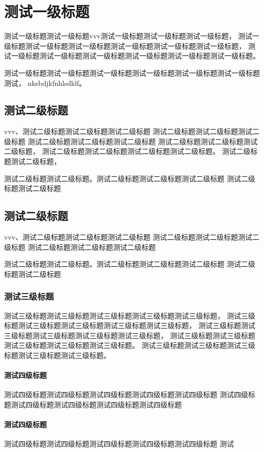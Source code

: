 \chapter{测试一级标题}
    测试一级标题测试一级标题vvv测试一级标题测试一级标题测试一级标题，
    测试一级标题测试一级标题测试一级标题测试一级标题测试一级标题测试一级标题，
    测试一级标题测试一级标题测试一级标题测试一级标题测试一级标题测试一级标题。

    测试一级标题测试一级标题测试一级标题测试一级标题测试一级标题测试一级标题测试，
    nksbdjkfnhlsdklf。
    \section{测试二级标题}
        vvv、测试二级标题测试二级标题测试二级标题
        测试二级标题测试二级标题测试二级标题
        测试二级标题测试二级标题测试二级标题
        测试二级标题测试二级标题测试二级标题，
        测试二级标题测试二级标题测试二级标题测试二级标题。
        测试二级标题测试二级标题，

        测试二级标题测试二级标题。测试二级标题测试二级标题测试二级标题
        测试二级标题测试二级标题
    \section{测试二级标题}
        vvv、测试二级标题测试二级标题测试二级标题
        测试二级标题测试二级标题测试二级标题
        测试二级标题测试二级标题测试二级标题

        测试二级标题测试二级标题。测试二级标题测试二级标题测试二级标题
        测试二级标题测试二级标题
        \subsection{测试三级标题}
            测试三级标题测试三级标题测试三级标题测试三级标题测试三级标题，
            测试三级标题测试三级标题测试三级标题测试三级标题测试三级标题，
            测试三级标题测试三级标题测试三级标题测试三级标题测试三级标题，
            测试三级标题测试三级标题测试三级标题测试三级标题测试三级标题。
            测试三级标题测试三级标题测试三级标题测试三级标题测试三级标题。
                \subsubsection{测试四级标题}
                    测试四级标题测试四级标题测试四级标题测试四级标题测试四级标题
                    测试四级标题测试四级标题测试四级标题测试四级标题测试四级标题
                \subsubsection{测试四级标题}
                    测试四级标题测试四级标题测试四级标题测试四级标题测试四级标题
                    测试
